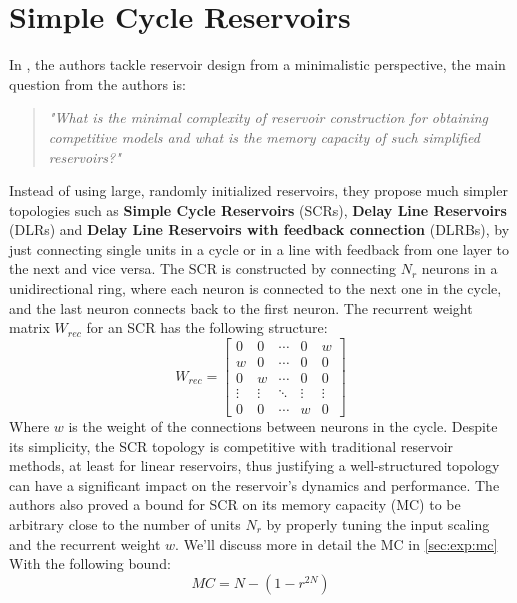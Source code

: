 \section{Simple Cycle Reservoirs} %
In \cite{mincomplex}, the authors tackle reservoir design from a minimalistic perspective, the main question from the authors is:
\begin{quote}
    \textit{"What is the minimal complexity of reservoir construction for obtaining competitive models and what is the memory capacity of such simplified reservoirs?"}
\end{quote}
Instead of using large, randomly initialized reservoirs, they propose much simpler topologies such as \textbf{Simple Cycle Reservoirs} (SCRs),
 \textbf{Delay Line Reservoirs} (DLRs) and \textbf{Delay Line Reservoirs with feedback connection} (DLRBs), 
 by just connecting single units in a cycle or in a line with feedback from one layer to the next and vice versa.
\newline
The SCR is constructed by connecting $N_r$ neurons in a unidirectional ring, where each neuron is connected to the next one in the cycle, and the last neuron connects back to the
    first neuron. The recurrent weight matrix $W_{rec}$ for an SCR has the following structure:
\begin{equation}
    W_{rec} =
    \begin{bmatrix}
        0 & 0 & \cdots & 0 & w \\
        w & 0 & \cdots & 0 & 0 \\
        0 & w & \cdots & 0 & 0 \\
        \vdots & \vdots & \ddots & \vdots & \vdots \\
        0 & 0 & \cdots & w & 0
    \end{bmatrix}
\end{equation}
Where $w$ is the weight of the connections between neurons in the cycle.
\newline
Despite its simplicity, the SCR topology is competitive with traditional reservoir methods, at least for linear reservoirs, thus justifying a well-structured topology 
can have a significant impact on the reservoir's dynamics and performance.\newline
 The authors also proved a bound for SCR on its memory capacity (MC) to be arbitrary
close to the number of units $N_r$ by properly tuning the input scaling and the recurrent weight $w$. We'll discuss more in detail the MC in \ref{sec:exp:mc}
With the following bound: 
\begin{equation}
    MC = N - (1 - r^{2N})
\end{equation}
\clearpage

